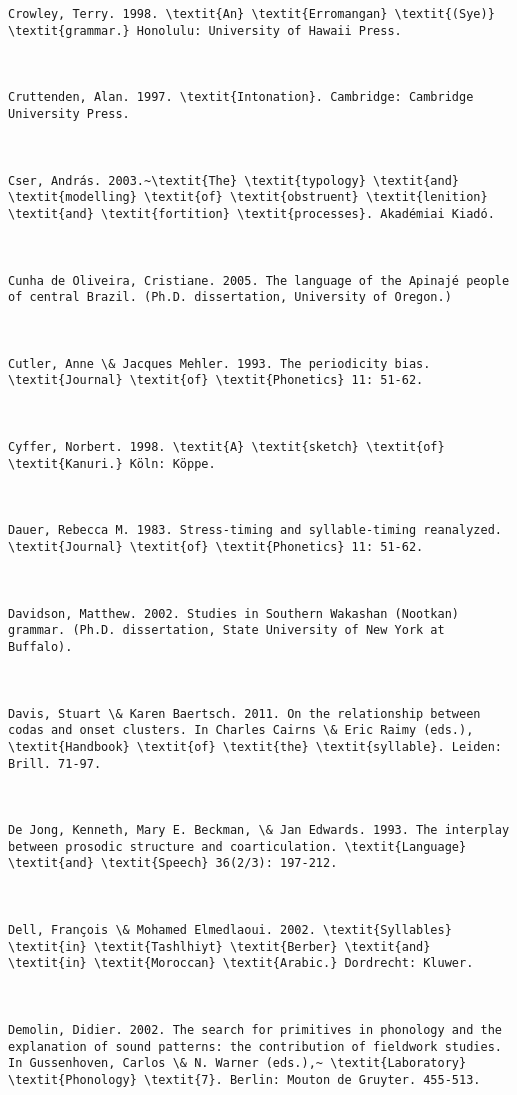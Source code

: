 \begin{verbatim}
Crowley, Terry. 1998. \textit{An} \textit{Erromangan} \textit{(Sye)} \textit{grammar.} Honolulu: University of Hawaii Press.



Cruttenden, Alan. 1997. \textit{Intonation}. Cambridge: Cambridge University Press.



Cser, András. 2003.~\textit{The} \textit{typology} \textit{and} \textit{modelling} \textit{of} \textit{obstruent} \textit{lenition} \textit{and} \textit{fortition} \textit{processes}. Akadémiai Kiadó.



Cunha de Oliveira, Cristiane. 2005. The language of the Apinajé people of central Brazil. (Ph.D. dissertation, University of Oregon.)



Cutler, Anne \& Jacques Mehler. 1993. The periodicity bias. \textit{Journal} \textit{of} \textit{Phonetics} 11: 51-62.



Cyffer, Norbert. 1998. \textit{A} \textit{sketch} \textit{of} \textit{Kanuri.} Köln: Köppe.



Dauer, Rebecca M. 1983. Stress-timing and syllable-timing reanalyzed. \textit{Journal} \textit{of} \textit{Phonetics} 11: 51-62.



Davidson, Matthew. 2002. Studies in Southern Wakashan (Nootkan) grammar. (Ph.D. dissertation, State University of New York at Buffalo).



Davis, Stuart \& Karen Baertsch. 2011. On the relationship between codas and onset clusters. In Charles Cairns \& Eric Raimy (eds.), \textit{Handbook} \textit{of} \textit{the} \textit{syllable}. Leiden: Brill. 71-97.



De Jong, Kenneth, Mary E. Beckman, \& Jan Edwards. 1993. The interplay between prosodic structure and coarticulation. \textit{Language} \textit{and} \textit{Speech} 36(2/3): 197-212.



Dell, François \& Mohamed Elmedlaoui. 2002. \textit{Syllables} \textit{in} \textit{Tashlhiyt} \textit{Berber} \textit{and} \textit{in} \textit{Moroccan} \textit{Arabic.} Dordrecht: Kluwer. 



Demolin, Didier. 2002. The search for primitives in phonology and the explanation of sound patterns: the contribution of fieldwork studies. In Gussenhoven, Carlos \& N. Warner (eds.),~ \textit{Laboratory} \textit{Phonology} \textit{7}. Berlin: Mouton de Gruyter. 455-513.




\end{verbatim}
